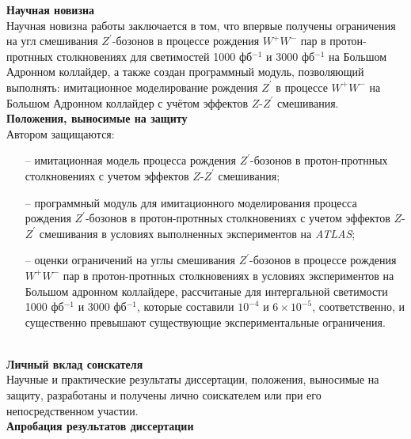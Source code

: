\vspace{16pt}
\textbf{Научная новизна}\\

Научная новизна работы заключается в том, что впервые получены ограничения на угл смешивания ${Z}^{\prime}$-бозонов в
процессе рождения ${W}^{+}$${W}^{-}$ пар в протон-протнных столкновениях для светимостей 1000 фб${}^{−1}$ и 3000 фб${}^{−1}$ на Большом Адронном коллайдер, а также создан программный модуль, позволяющий выполнять: имитационное моделирование рождения ${Z}^{\prime}$ в процессе ${W}^{+}{W}^{-}$
на Большом Адронном коллайдер с учётом эффектов $Z$-${Z}^{\prime}$ смешивания.
\\

\textbf{Положения, выносимые на защиту}\\

Автором защищаются:
\begin{itemize}
	\item[--] имитационная модель процесса рождения ${Z}^{\prime}$-бозонов в протон-протнных столкновениях с учетом эффектов $Z$-${Z}^{\prime}$ смешивания;
	
	\item[--] программный модуль для имитационного моделирования процесса
	рождения ${Z}^{\prime}$-бозонов в протон-протнных столкновениях с учетом эффектов $Z$-${Z}^{\prime}$ смешивания в условиях
	выполненных экспериментов на \textit{ATLAS};
	
	\item[--] оценки ограничений на углы смешивания ${Z}^{\prime}$-бозонов в
	процессе рождения ${W}^{+}$${W}^{-}$ пар в протон-протнных столкновениях
	в условиях экспериментов на Большом адронном коллайдере, рассчитаные для интергальной светимости 1000 фб${}^{−1}$ и 3000 фб${}^{−1}$, которые составили  ${10}^{-4}$ и $6\times{10}^{-5}$, соответственно, и существенно превышают существующие экспериментальные ограничения.
	
\end{itemize}
\\

\textbf{Личный вклад соискателя}\\

Научные и практические результаты диссертации, положения, выносимые на защиту, разработаны и получены лично соискателем или при его непосредственном участии.
\\

\textbf{Апробация результатов диссертации}\\

